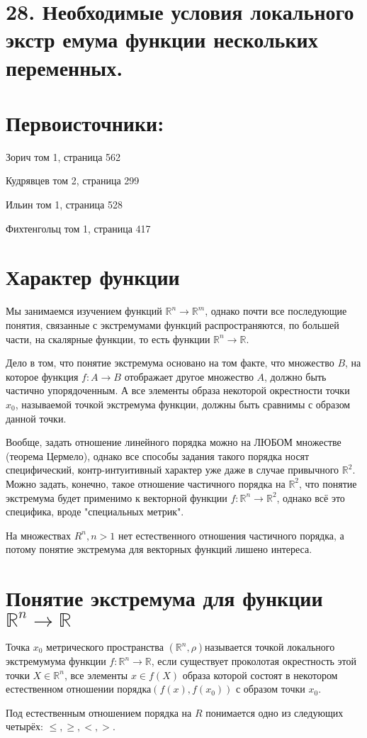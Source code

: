 \section{28. Необходимые условия локального экстр    емума функции нескольких переменных.}
\section*{Первоисточники:}
\parindent=0cm
Зорич том 1, страница 562

Кудрявцев том 2, страница 299

Ильин том 1, страница 528

Фихтенгольц том 1, страница 417

\section{Характер функции}
\parindent=1cm
Мы занимаемся изучением функций $\mathbb{R}^n \to \mathbb{R}^m$, однако почти все последующие понятия, связанные с экстремумами функций распространяются, по большей части, на скалярные функции, то есть функции $\mathbb{R}^n \to \mathbb{R}$.

Дело в том, что понятие экстремума основано на том факте, что множество $B$, на которое функция $f: A \to B$ отображает другое множество $A$, должно быть частично упорядоченным. А все элементы образа некоторой окрестности точки $x_0$, называемой точкой экстремума функции, должны быть сравнимы с образом данной точки.

Вообще, задать отношение линейного порядка можно на ЛЮБОМ множестве (теорема Цермело), однако все способы задания такого порядка носят специфический, контр-интуитивный характер уже даже в случае привычного $\mathbb{R}^2$. Можно задать, конечно, такое отношение частичного порядка на $\mathbb{R}^2$, что понятие экстремума будет применимо к векторной функции $f: \mathbb{R}^n \to \mathbb{R}^2$, однако всё это специфика, вроде "специальных метрик". 

На множествах $R^n, n>1$ нет естественного отношения частичного порядка, а потому понятие экстремума для векторных функций лишено интереса.
\section{Понятие экстремума для функции\linebreak $\mathbb{R}^n \to \mathbb{R}$}
\begin{ftdef}
Точка $x_0$ метрического пространства $(\mathbb{R}^n, \rho)$\linebreak называется точкой локального экстремумума функции $f: \mathbb{R}^n \to \mathbb{R}$, если существует проколотая окрестность этой точки $X \in \mathbb{R}^n$, все элементы $x \in f(X)$ образа которой состоят в некотором естественном отношении порядка\linebreak $(f(x), f(x_0))$ с образом точки $x_0$.

Под естественным отношением порядка на $R$ понимается одно из следующих четырёх: $\leq, \geq, <, >$.
\end{ftdef}

